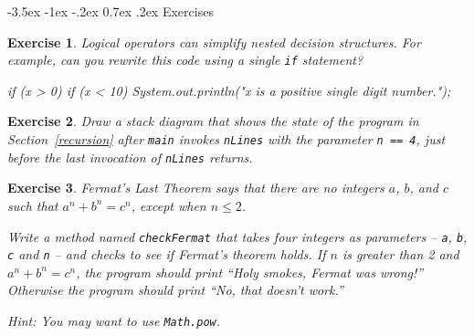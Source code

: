 \documentclass[12pt]{book}
\makeatletter
\theoremstyle{exercise}
\newtheorem{exercise}{Exercise}[chapter]
\newcommand{\java}[1]{\verb"#1"}
\renewcommand{\section}{\@startsection{section}{1}{\z@}%
    {-3.5ex \@plus -1ex \@minus -.2ex}%
    {0.7ex \@plus.2ex}%
    {\normalfont\Large\bfseries}}
\newcommand{\java}[1]{\lstinline{#1}} %
\makeatother
\begin{document}
\section{Exercises}


\begin{exercise}

Logical operators can simplify nested decision structures.
For example, can you rewrite this code using a single \java{if} statement?

\begin{code}
    if (x > 0) {
        if (x < 10) {
            System.out.println("x is a positive single digit number.");
        }
    }
\end{code}

\end{exercise}


\begin{exercise}

Draw a stack diagram that shows the state of the program in Section~\ref{recursion} after \java{main} invokes \java{nLines} with the parameter \java{n == 4}, just before the last invocation of \java{nLines} returns.

\end{exercise}


\begin{exercise}

Fermat's Last Theorem says that there are no integers $a$, $b$, and $c$ such that $a^n + b^n = c^n$, except when $n \leq 2$.

Write a method named \java{checkFermat} that takes four integers as parameters -- \java{a}, \java{b}, \java{c} and \java{n} -- and checks to see if Fermat's theorem holds.
If $n$ is greater than 2 and $a^n + b^n = c^n$, the program should print ``Holy smokes, Fermat was wrong!''
Otherwise the program should print ``No, that doesn't work.''

Hint: You may want to use \java{Math.pow}.

\end{exercise}
\end{document}
